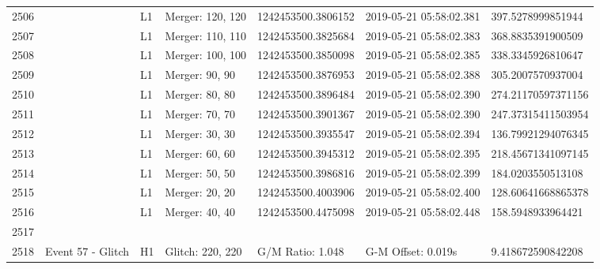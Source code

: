 \begin{longtable}{lllllll}
2506 &                                                    &       L1 &  Merger: 120, 120 &  1242453500.3806152 &  2019-05-21 05:58:02.381 &   397.5278999851944 \\
2507 &                                                    &       L1 &  Merger: 110, 110 &  1242453500.3825684 &  2019-05-21 05:58:02.383 &   368.8835391900509 \\
2508 &                                                    &       L1 &  Merger: 100, 100 &  1242453500.3850098 &  2019-05-21 05:58:02.385 &   338.3345926810647 \\
2509 &                                                    &       L1 &    Merger: 90, 90 &  1242453500.3876953 &  2019-05-21 05:58:02.388 &   305.2007570937004 \\
2510 &                                                    &       L1 &    Merger: 80, 80 &  1242453500.3896484 &  2019-05-21 05:58:02.390 &  274.21170597371156 \\
2511 &                                                    &       L1 &    Merger: 70, 70 &  1242453500.3901367 &  2019-05-21 05:58:02.390 &  247.37315411503954 \\
2512 &                                                    &       L1 &    Merger: 30, 30 &  1242453500.3935547 &  2019-05-21 05:58:02.394 &  136.79921294076345 \\
2513 &                                                    &       L1 &    Merger: 60, 60 &  1242453500.3945312 &  2019-05-21 05:58:02.395 &  218.45671341097145 \\
2514 &                                                    &       L1 &    Merger: 50, 50 &  1242453500.3986816 &  2019-05-21 05:58:02.399 &   184.0203550513108 \\
2515 &                                                    &       L1 &    Merger: 20, 20 &  1242453500.4003906 &  2019-05-21 05:58:02.400 &  128.60641668865378 \\
2516 &                                                    &       L1 &    Merger: 40, 40 &  1242453500.4475098 &  2019-05-21 05:58:02.448 &   158.5948933964421 \\
2517 &                                                    &          &                   &                     &                          &                     \\
2518 &                                  Event 57 - Glitch &       H1 &  Glitch: 220, 220 &    G/M Ratio: 1.048 &       G-M Offset: 0.019s &   9.418672590842208 \\

\end{longtable}

